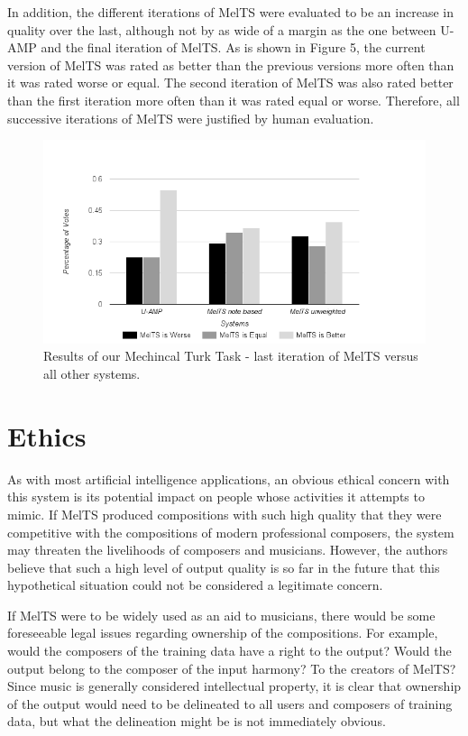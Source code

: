 \documentclass{sig-alternate}
\begin{document}
In addition, the different iterations of MelTS were evaluated to be an increase in quality over the last, although not by as wide of a margin as the one between U-AMP and the final iteration of MelTS. As is shown in Figure 5, the current version of MelTS was rated as better than the previous versions more often than it was rated worse or equal. The second iteration of MelTS was also rated better than the first iteration more often than it was rated equal or worse. Therefore, all successive iterations of MelTS were justified by human evaluation.

\begin{figure}
\includegraphics[scale=0.4]{mturk_results}
\caption{Results of our Mechincal Turk Task - last iteration of MelTS versus all other systems.}
\end{figure}
\label{sec:system_performance}


\section{Ethics}
As with most artificial intelligence applications, an obvious ethical concern with this system is its potential impact on people whose activities it attempts to mimic. If MelTS produced compositions with such high quality that they were competitive with the compositions of modern professional composers, the system may threaten the livelihoods of composers and musicians. However, the authors believe that such a high level of output quality is so far in the future that this hypothetical situation could not be considered a legitimate concern.

If MelTS were to be widely used as an aid to musicians, there would be some foreseeable legal issues regarding ownership of the compositions. For example, would the composers of the training data have a right to the output? Would the output belong to the composer of the input harmony? To the creators of MelTS? Since music is generally considered intellectual property, it is clear that ownership of the output would need to be delineated to all users and composers of training data, but what the delineation might be is not immediately obvious.
\label{sec:ethics}
\end{document}
